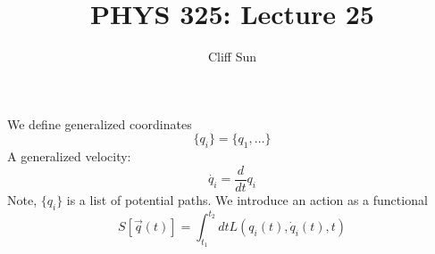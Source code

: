 \documentclass{article}
\title{PHYS 325: Lecture 25}
\author{Cliff Sun}
\newtheorem{one minute paper}[theorem]{One Minute Paper}
\begin{document}
\maketitle

We define generalized coordinates 
\begin{equation}
    \{q_i\} = \{q_1, \dots\}
\end{equation}
A generalized velocity:
\begin{equation}
    \dot{q_i} = \frac{d}{dt}q_i
\end{equation}
Note, $\{q_i\}$ is a list of potential paths. We introduce an action as a functional 
\begin{equation}
    S[\vec{q}(t)] = \int_{t_1}^{t_2}dtL(q_i(t), \dot{q}_i(t), t)
\end{equation}
\end{document}
